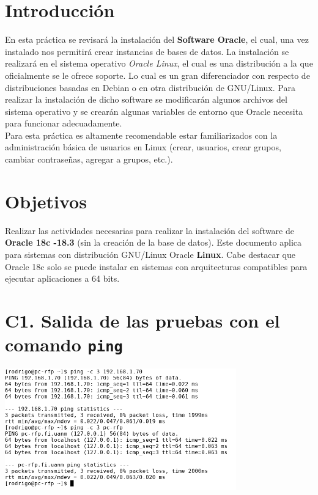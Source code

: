 \documentclass{article}
\begin{document}
\section*{Introducción}
En esta práctica se revisará la instalación del \textbf{Software Oracle}, el 
cual, una vez instalado nos permitirá crear instancias de bases de datos.
La instalación se realizará en el sistema operativo \textit{Oracle Linux}, 
el cual es una distribución a la que oficialmente se le ofrece soporte. Lo cual
es un gran diferenciador con respecto de distribuciones basadas en Debian o
en otra distribución de GNU/Linux. Para realizar la instalación de dicho 
software se modificarán algunos archivos del sistema operativo y se crearán 
algunas variables de entorno que Oracle necesita para funcionar adecuadamente.\\

Para esta práctica es altamente recomendable estar familiarizados con la 
administración básica de usuarios en Linux (crear, usuarios, crear grupos, 
cambiar contraseñas, agregar a grupos, etc.).

\section*{Objetivos}
Realizar las actividades necesarias para realizar la instalación del software 
de \textbf{Oracle 18c -18.3 } (sin la creación de la base de datos). 
Este documento aplica para sistemas con distribución GNU/Linux Oracle 
\textbf{Linux}. Cabe destacar que Oracle 18c solo se puede instalar en sistemas 
con arquitecturas compatibles para ejecutar aplicaciones a 64 bits.

\section*{C1. Salida de las pruebas con el comando \texttt{ping}}
\includegraphics[width=10cm]{c01}    
\end{document}

